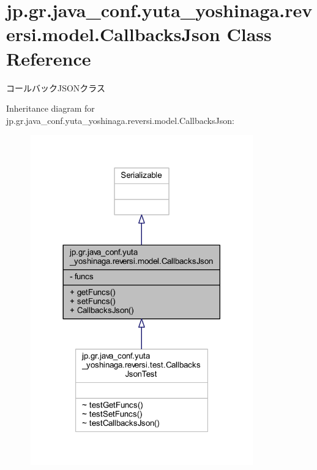 \hypertarget{classjp_1_1gr_1_1java__conf_1_1yuta__yoshinaga_1_1reversi_1_1model_1_1_callbacks_json}{}\section{jp.\+gr.\+java\+\_\+conf.\+yuta\+\_\+yoshinaga.\+reversi.\+model.\+Callbacks\+Json Class Reference}
\label{classjp_1_1gr_1_1java__conf_1_1yuta__yoshinaga_1_1reversi_1_1model_1_1_callbacks_json}


コールバック\+J\+S\+O\+Nクラス  




Inheritance diagram for jp.\+gr.\+java\+\_\+conf.\+yuta\+\_\+yoshinaga.\+reversi.\+model.\+Callbacks\+Json\+:\nopagebreak
\begin{figure}[H]
\begin{center}
\leavevmode
\includegraphics[width=272pt]{classjp_1_1gr_1_1java__conf_1_1yuta__yoshinaga_1_1reversi_1_1model_1_1_callbacks_json__inherit__graph}
\end{center}
\end{figure}


